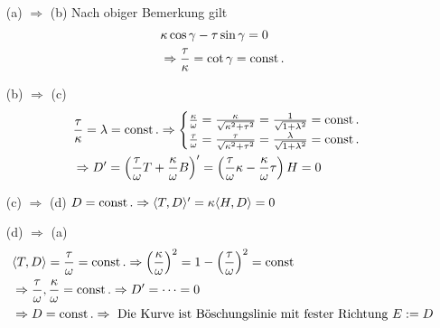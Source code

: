 \begin{beweis} \(\)
\begin{enumerate}
 \item[(a) \(\Rightarrow\) (b)] Nach obiger Bemerkung gilt
 \begin{align*}
  &\kappa \cos \gamma - \tau \sin \gamma = 0 \\
  &\Rightarrow \frac{\tau}{\kappa} = \cot \gamma = \operatorname{const}.
 \end{align*}
 \item[(b) \(\Rightarrow\) (c)] 
 \begin{align*}                                 
&\frac{\tau}{\kappa} = \lambda = \operatorname{const}. \Rightarrow \begin{cases}
                                                     \frac{\kappa}{\omega} = \frac{\kappa}{\sqrt{\kappa^2 + \tau^2}} = \frac{1}{\sqrt{1 + \lambda^2}} = \operatorname{const}. \\
                                                     \frac{\tau}{\omega} = \frac{\tau}{\sqrt{\kappa^2 + \tau^2}} = \frac{\lambda}{\sqrt{1 + \lambda^2}} = \operatorname{const}.
                                                    \end{cases} \\
&\Rightarrow D' = \left(\frac{\tau}{\omega} T + \frac{\kappa}{\omega} B\right)' = \left(\frac{\tau}{\omega} \kappa - \frac{\kappa}{\omega} \tau\right)H = 0
\end{align*}
\item[(c) \(\Rightarrow\) (d)] \(D = \operatorname{const}. \Rightarrow \langle T, D \rangle' = \kappa \langle H, D\rangle = 0\)
\item[(d) \(\Rightarrow\) (a)] \begin{align*}                               
&\langle T, D\rangle = \frac{\tau}{\omega} = \operatorname{const}. \Rightarrow \left(\frac{\kappa}{\omega}\right)^2 = 1 - \left(\frac{\tau}{\omega}\right)^2 = \operatorname{const} \\
&\Rightarrow \frac{\tau}{\omega}, \frac{\kappa}{\omega} = \operatorname{const}. \Rightarrow D' = \dots = 0 \\
&\Rightarrow D = \operatorname{const}. \Rightarrow \text{ Die Kurve ist Böschungslinie mit fester Richtung } E := D
                               \end{align*}
 \end{enumerate}
\end{beweis}

